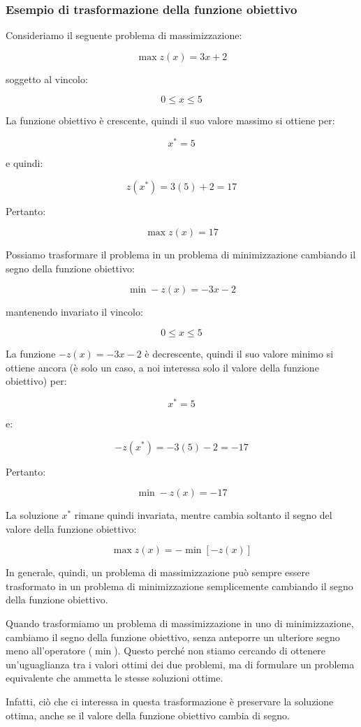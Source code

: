 \subsubsection{Esempio di trasformazione della funzione obiettivo}

Consideriamo il seguente problema di massimizzazione:

$$
\max z(x) = 3x+2
$$

soggetto al vincolo:

$$
0 \leq x \leq 5
$$

La funzione obiettivo è crescente, quindi il suo valore massimo si ottiene per:

$$
x^* = 5
$$

e quindi:

$$
z(x^*) = 3(5)+2=17
$$

Pertanto:

$$
\max z(x)=17
$$

Possiamo trasformare il problema in un problema di minimizzazione cambiando il segno della funzione obiettivo:

$$
\min -z(x) = -3x-2
$$

mantenendo invariato il vincolo:

$$
0 \leq x \leq 5
$$

La funzione $-z(x)=-3x-2$ è decrescente, quindi il suo valore minimo si ottiene ancora (è solo un caso, a noi interessa solo il valore della funzione obiettivo) per:

$$
x^*=5
$$

e:

$$
-z(x^*)=-3(5)-2=-17
$$

Pertanto:

$$
\min -z(x)=-17
$$

La soluzione $x^*$ rimane quindi invariata, mentre cambia soltanto il segno del valore della funzione obiettivo:

$$
\boxed{\max z(x)=-\min[-z(x)]}
$$

In generale, quindi, un problema di massimizzazione può sempre essere trasformato in un problema di minimizzazione semplicemente cambiando il segno della funzione obiettivo.


\begin{remark}{}
Quando trasformiamo un problema di massimizzazione in uno di minimizzazione, cambiamo il segno della funzione obiettivo, senza anteporre un ulteriore segno meno all'operatore ($\min$).
Questo perché non stiamo cercando di ottenere un'uguaglianza tra i valori ottimi dei due problemi, ma di formulare un problema equivalente che ammetta le stesse soluzioni ottime.

Infatti, ciò che ci interessa in questa trasformazione è preservare la soluzione ottima, anche se il valore della funzione obiettivo cambia di segno.
\end{remark}
